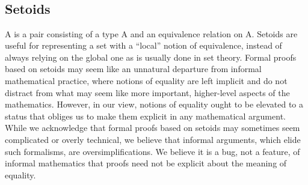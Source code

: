 \begin{code}%
\>[0]\AgdaSpace{}%
\AgdaModule{\AgdaUnderscore{}}\AgdaSpace{}%
\AgdaSymbol{\{}\AgdaSpace{}%
\AgdaSymbol{:}\AgdaSpace{}%
\AgdaSpace{}%
\AgdaSpace{}%
\AgdaSymbol{\}\{}\AgdaSpace{}%
\AgdaSymbol{:}\AgdaSpace{}%
\AgdaSpace{}%
\AgdaSpace{}%
\AgdaSpace{}%
\AgdaSymbol{\}}\AgdaSpace{}%
\<%
\\
\>[0][@{}l@{\AgdaIndent{0}}]%
\>[1]\AgdaSpace{}%
\AgdaSymbol{:}\AgdaSpace{}%
\AgdaFunction{Σ[}\AgdaSpace{}%
\AgdaSpace{}%
\AgdaSpace{}%
\AgdaSpace{}%
\AgdaFunction{]}\AgdaSpace{}%
\AgdaSpace{}%
\AgdaSpace{}%
\AgdaSpace{}%
\<%
\\
%
\>[1]\AgdaSpace{}%
\AgdaSymbol{=}\AgdaSpace{}%
\<%
\\
%
\>[1]\AgdaSpace{}%
\AgdaSymbol{:}\AgdaSpace{}%
\AgdaSymbol{(}\AgdaSpace{}%
\AgdaSymbol{:}\AgdaSpace{}%
\AgdaFunction{Σ[}\AgdaSpace{}%
\AgdaSpace{}%
\AgdaSpace{}%
\AgdaSpace{}%
\AgdaFunction{]}\AgdaSpace{}%
\AgdaSpace{}%
\AgdaSymbol{)}\AgdaSpace{}%
\AgdaSpace{}%
\AgdaSpace{}%
\AgdaSpace{}%
\AgdaSpace{}%
\<%
\\
%
\>[1]\AgdaSpace{}%
\AgdaSymbol{=}\AgdaSpace{}%
\<%
\end{code}
\fi

\subsection{Setoids}\label{setoids}
A  is a pair consisting of a type \ab A and
an equivalence relation  on \ab A.  Setoids are useful for representing a
set with a ``local'' notion of equivalence, instead of always relying on
the global one as is usually done in set theory. Formal proofs based on setoids
may seem like an unnatural departure from informal mathematical practice, where
notions of equality are left implicit and do not distract from what may seem
like more important, higher-level aspects of the mathematics. However, in our
view, notions of equality ought to be elevated to a status that obliges us to
make them explicit in any mathematical argument.  While we acknowledge that formal
proofs based on setoids may sometimes seem complicated or overly technical, we
believe that informal arguments, which elide such formalisms, are
oversimplifications.  We believe it is a bug, not a feature, of informal
mathematics that proofs need not be explicit about the meaning of equality.

